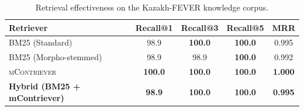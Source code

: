 \begin{table}[ht]
\centering
\small
\caption{Retrieval effectiveness on the Kazakh-FEVER knowledge corpus.}
\label{tab:retrieval_results}
\begin{tabular}{lcccc}
\toprule
\textbf{Retriever} & \textbf{Recall@1} & \textbf{Recall@3} & \textbf{Recall@5} & \textbf{MRR} \\
\midrule
BM25 (Standard) & 98.9 & \textbf{100.0} & \textbf{100.0} & 0.995 \\
BM25 (Morpho-stemmed) & 98.9 & 98.9 & \textbf{100.0} & 0.992 \\
\textsc{mContriever} & \textbf{100.0} & \textbf{100.0} & \textbf{100.0} & \textbf{1.000} \\
\textbf{Hybrid (BM25 + mContriever)} & \textbf{98.9} & \textbf{100.0} & \textbf{100.0} & \textbf{0.995} \\
\bottomrule
\end{tabular}
\end{table}
